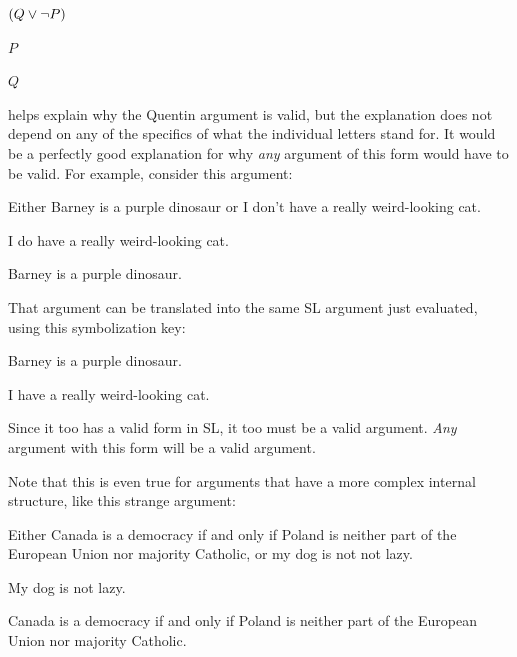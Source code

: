 \begin{earg}
\item $(Q\vee\neg P)$
\item $P$
\item[\therefore] $Q$
\end{earg}

helps explain why the Quentin argument is valid, but the explanation does not depend on any of the specifics of what the individual letters stand for. It would be a perfectly good explanation for why \emph{any} argument of this form would have to be valid. For example, consider this argument:

\begin{earg}
\item Either Barney is a purple dinosaur or I don't have a really weird-looking cat.
\item I do have a really weird-looking cat.
\item[\therefore] Barney is a purple dinosaur.
\end{earg}

That argument can be translated into the same SL argument just evaluated, using this symbolization key:

\begin{ekey}
\item[Q:] Barney is a purple dinosaur.
\item[P:] I have a really weird-looking cat.
\end{ekey}

Since it too has a valid form in SL, it too must be a valid argument. \emph{Any} argument with this form will be a valid argument.


Note that this is even true for arguments that have a more complex internal structure, like this strange argument:

\begin{earg}
\item Either Canada is a democracy if and only if Poland is neither part of the European Union nor majority Catholic, or my dog is not not lazy.
\item My dog is not lazy.
\item[\therefore] Canada is a democracy if and only if Poland is neither part of the European Union nor majority Catholic.
\end{earg}

